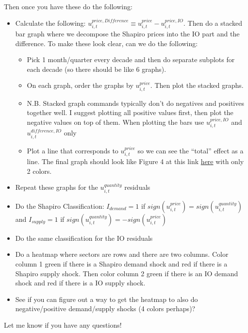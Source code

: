 \documentclass[12pt,english]{article}
\begin{document}
Then once you have these do the following:

\begin{itemize}
	\item Calculate the following: $u^{price,Difference}_{i,t} \equiv u_{i,t}^{price}-u_{i,t}^{price,IO}$. Then do a stacked bar graph where we decompose the Shapiro prices into the IO part and the difference. To make these look clear, can we do the following:
	\begin{itemize}
		\item Pick 1 month/quarter every decade and then do separate subplots for each decade (so there should be like 6 graphs). 
		\item On each graph, order the graphs by $u_{i,t}^{price}$. Then plot the stacked graphs.
		\item N.B. Stacked graph commands typically don't do negatives and positives together well. I suggest plotting all positive values first, then plot the negative values on top of them. When plotting the bars use $u_{i,t}^{price,IO}$ and $u_{i,t}^{difference,IO}$ only 
		\item Plot a line that corresponds to $u_{i,t}^{price}$ so we can see the ``total'' effect as a line. The final graph should look like Figure 4 at this link \href{https://www.rbnz.govt.nz/-/media/project/sites/rbnz/files/publications/analytical-notes/2013/an2013-09.pdf#page=13}{here} with only 2 colors.	
	\end{itemize}
	\item Repeat these graphs for the $u_{i,t}^{quantity}$ residuals 
	\item Do the Shapiro Classification: $I_{demand}=1$ if $sign(u_{i,t}^{price})=sign(u_{i,t}^{quantity})$ and $I_{supply}=1$ if $sign(u_{i,t}^{quantity})=-sign(u_{i,t}^{price})$
	\item Do the same classification for the IO residuals
	\item Do a heatmap where sectors are rows and there are two columns. Color column 1 green if there is a Shapiro demand shock and red if there is a Shapiro supply shock. Then color column 2 green if there is an IO demand shock and red if there is a IO supply shock.
	\item See if you can figure out a way to get the heatmap to also do negative/positive demand/supply shocks (4 colors perhaps)?
\end{itemize}

Let me know if you have any questions!
\end{document}
